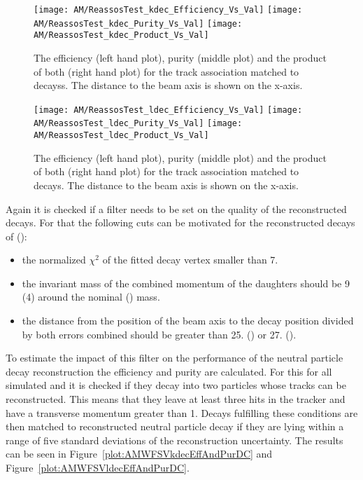 \begin{figure}[!ht]
  \centering
  \texttt{[image: AM/ReassosTest\_kdec\_Efficiency\_Vs\_Val]}
  \texttt{[image: AM/ReassosTest\_kdec\_Purity\_Vs\_Val]}
  \texttt{[image: AM/ReassosTest\_kdec\_Product\_Vs\_Val]}
  \caption[Efficiency, purity and their product of the association with \PKzS{} decays for different search options as a function of distance to the beam axis]{The efficiency (left hand plot), purity (middle plot) and the product of both (right hand plot) for the track association matched to \PKzS{} decayss. The distance to the beam axis is shown on the x-axis.\label{plot:AMWFSVkdecEffAndPurSO}}
\end{figure}
\begin{figure}[!ht]
  \centering
  \texttt{[image: AM/ReassosTest\_ldec\_Efficiency\_Vs\_Val]}
  \texttt{[image: AM/ReassosTest\_ldec\_Purity\_Vs\_Val]}
  \texttt{[image: AM/ReassosTest\_ldec\_Product\_Vs\_Val]}
  \caption[Efficiency, purity and their product of the association with \PgL{} decays for different search options as a function of distance to the beam axis]{The efficiency (left hand plot), purity (middle plot) and the product of both (right hand plot) for the track association matched to \PgL{} decays. The distance to the beam axis is shown on the x-axis.\label{plot:AMWFSVldecEffAndPurSO}}
\end{figure}

Again it is checked if a filter needs to be set on the quality of the reconstructed decays. For that the following cuts can be motivated for the reconstructed decays of \PKzS{} (\PgL{}):
\begin{itemize}
\item the normalized $\chi^{2}$ of the fitted decay vertex smaller than 7.
\item the invariant mass of the combined momentum of the daughters should be 9\MeVcc{} (4\MeVcc{}) around the nominal \PKzS{} (\PgL{}) mass.
\item the distance from the position of the beam axis to the decay position divided by both errors combined should be greater than 25. (\PKzS{}) or 27.  (\PgL{}).
\end{itemize}
To estimate the impact of this filter on the performance of the neutral particle decay reconstruction the efficiency and purity are calculated. For this for all simulated \PKzS{} and \PgL{} it is checked if they decay into two particles whose tracks can be reconstructed. This means that they leave at least three hits in the tracker and have a transverse momentum greater than 1\GeV. Decays fulfilling these conditions are then matched to reconstructed neutral particle decay if they are lying within a range of five standard deviations of the reconstruction uncertainty. The results can be seen in Figure~\ref{plot:AMWFSVkdecEffAndPurDC} and Figure~\ref{plot:AMWFSVldecEffAndPurDC}.

